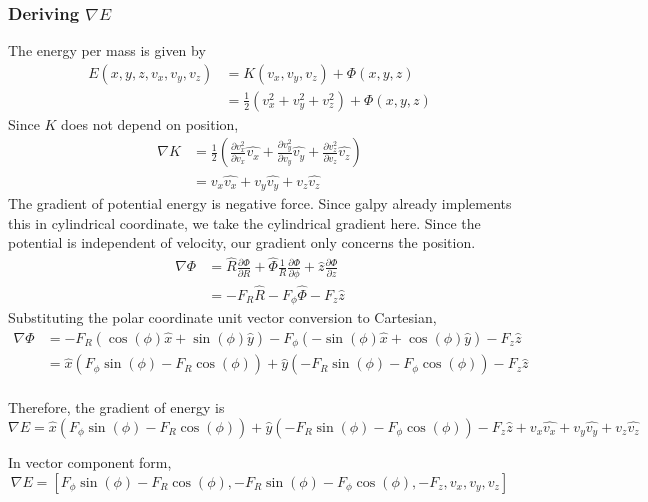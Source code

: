 \documentclass[12pt]{article}
\begin{document}
\subsubsection{Deriving $\nabla E$}
The energy per mass is given by 
\begin{align*}
E(x,y,z,v_x,v_y,v_z) &= K(v_x,v_y,v_z) + \Phi(x,y,z) \\
&= \frac{1}{2}(v_x^2 + v_y^2 + v_z^2) + \Phi(x,y,z)
\end{align*}
Since $K$ does not depend on position,
\begin{align*}
\nabla K &= \frac{1}{2}(\frac{\partial v_x^2}{\partial v_x} \hat{v_x} +\frac{\partial v_y^2}{\partial v_y}\hat{v_y} + \frac{\partial v_z^2}{\partial v_z} \hat{v_z}) \\
&= v_x \hat{v_x} + v_y \hat{v_y} + v_z \hat{v_z} 
\end{align*}
The gradient of potential energy is negative force. Since galpy already implements this in cylindrical coordinate, we take the cylindrical gradient here. Since the potential is independent of velocity, our gradient only concerns the position.
\begin{align*}
 \nabla \Phi &= \hat{R} \frac{\partial \Phi}{\partial R} + \hat{\Phi} \frac{1}{R}\frac{\partial \Phi}{\partial \phi} + \hat{z}\frac{\partial \Phi}{\partial z} \\
&= - F_R \hat{R}  -F_{\phi} \hat{\Phi} - F_z \hat{z}
\end{align*}
Substituting the polar coordinate unit vector conversion to Cartesian,
\begin{align*}
 \nabla \Phi &= - F_R (\cos(\phi) \hat{x} + \sin(\phi) \hat{y})  -F_{\phi} (- \sin(\phi) \hat{x} + \cos(\phi) \hat{y}) - F_z \hat{z} \\
 &= \hat{x}(F_{\phi} \sin(\phi)- F_R \cos(\phi)) + \hat{y}(- F_R \sin(\phi) -F_{\phi} \cos(\phi)) - F_z \hat{z} \\
\end{align*}

Therefore, the gradient of energy is
$$ \nabla E =  \hat{x}(F_{\phi} \sin(\phi)- F_R \cos(\phi)) + \hat{y}(- F_R \sin(\phi) -F_{\phi} \cos(\phi)) - F_z \hat{z} + v_x \hat{v_x} + v_y \hat{v_y} + v_z \hat{v_z} $$

In vector component form, 
$$ \nabla E = [F_{\phi} \sin(\phi)- F_R \cos(\phi),- F_R \sin(\phi) -F_{\phi} \cos(\phi), - F_z ,v_x, v_y, v_z ] $$
\end{document}
